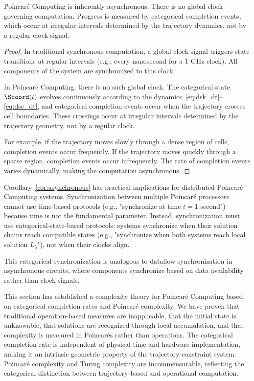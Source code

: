 \begin{corollary}
\label{cor:asynchronous}
Poincaré Computing is inherently asynchronous. There is no global clock governing computation. Progress is measured by categorical completion events, which occur at irregular intervals determined by the trajectory dynamics, not by a regular clock signal.
\end{corollary}

\begin{proof}
In traditional synchronous computation, a global clock signal triggers state transitions at regular intervals (e.g., every nanosecond for a 1 GHz clock). All components of the system are synchronized to this clock.

In Poincaré Computing, there is no such global clock. The categorical state $\Scoord(t)$ evolves continuously according to the dynamics~\eqref{eq:dsk_dt}--\eqref{eq:dse_dt}, and categorical completion events occur when the trajectory crosses cell boundaries. These crossings occur at irregular intervals determined by the trajectory geometry, not by a regular clock.

For example, if the trajectory moves slowly through a dense region of cells, completion events occur frequently. If the trajectory moves quickly through a sparse region, completion events occur infrequently. The rate of completion events varies dynamically, making the computation asynchronous.
\end{proof}

\begin{remark}
\label{rem:synchronization}
Corollary~\ref{cor:asynchronous} has practical implications for distributed Poincaré Computing systems. Synchronization between multiple Poincaré processors cannot use time-based protocols (e.g., "synchronize at time $t = 1$ second") because time is not the fundamental parameter. Instead, synchronization must use categorical-state-based protocols: systems synchronize when their solution chains reach compatible states (e.g., "synchronize when both systems reach local solution $L_5$"), not when their clocks align.

This categorical synchronization is analogous to dataflow synchronization in asynchronous circuits, where components synchronize based on data availability rather than clock signals.
\end{remark}

This section has established a complexity theory for Poincaré Computing based on categorical completion rates and Poincaré complexity. We have proven that traditional operation-based measures are inapplicable, that the initial state is unknowable, that solutions are recognized through local accumulation, and that complexity is measured in Poincarés rather than operations. The categorical completion rate is independent of physical time and hardware implementation, making it an intrinsic geometric property of the trajectory-constraint system. Poincaré complexity and Turing complexity are incommensurable, reflecting the categorical distinction between trajectory-based and operational computation.

